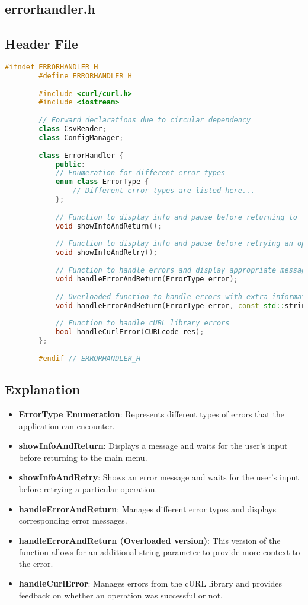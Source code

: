 \documentclass{article}
\begin{document}
	\subsection{errorhandler.h}
	
	\subsection*{Header File}
	\begin{lstlisting}[language=C++]
		#ifndef ERRORHANDLER_H
		#define ERRORHANDLER_H
		
		#include <curl/curl.h>
		#include <iostream>
		
		// Forward declarations due to circular dependency
		class CsvReader; 
		class ConfigManager; 
		
		class ErrorHandler {
			public:
			// Enumeration for different error types
			enum class ErrorType {
				// Different error types are listed here...
			};
			
			// Function to display info and pause before returning to the main menu
			void showInfoAndReturn();
			
			// Function to display info and pause before retrying an operation
			void showInfoAndRetry();
			
			// Function to handle errors and display appropriate messages
			void handleErrorAndReturn(ErrorType error);
			
			// Overloaded function to handle errors with extra information
			void handleErrorAndReturn(ErrorType error, const std::string& extraInfo);
			
			// Function to handle cURL library errors
			bool handleCurlError(CURLcode res);
		};
		
		#endif // ERRORHANDLER_H
	\end{lstlisting}
	
	\subsection*{Explanation}
	\begin{itemize}
		\item \textbf{ErrorType Enumeration}: Represents different types of errors that the application can encounter.
		\item \textbf{showInfoAndReturn}: Displays a message and waits for the user's input before returning to the main menu.
		\item \textbf{showInfoAndRetry}: Shows an error message and waits for the user's input before retrying a particular operation.
		\item \textbf{handleErrorAndReturn}: Manages different error types and displays corresponding error messages.
		\item \textbf{handleErrorAndReturn (Overloaded version)}: This version of the function allows for an additional string parameter to provide more context to the error.
		\item \textbf{handleCurlError}: Manages errors from the cURL library and provides feedback on whether an operation was successful or not.
	\end{itemize}
	
\end{document}
